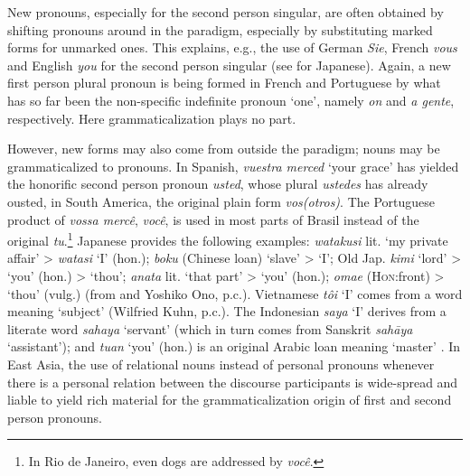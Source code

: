 New pronouns, especially for the second person singular, are often obtained by shifting pronouns around in the paradigm, especially by substituting marked forms for unmarked ones. This explains, e.g., the use of German \textit{Sie}, French \textit{vous} and English \textit{you} for the second person singular (see \citealt[112]{Syromjatnikov1980} for Japanese). Again, a new first person plural pronoun is being formed in French and Portuguese by what has so far been the non-specific indefinite pronoun ‘one’, namely \textit{on} and \textit{a gente}, respectively. Here grammaticalization plays no part.

However, new forms may also come from outside the paradigm; nouns may be grammaticalized to pronouns. In Spanish, \textit{vuestra merced} ‘your grace’ has yielded the honorific second person pronoun \textit{usted}, whose plural \textit{ustedes} has already ousted, in South America, the original plain form \textit{vos(otros)}. The Portuguese product of \textit{vossa mercê}, \textit{você}, is used in most parts of Brasil instead of the original \textit{tu}.\footnote{In Rio de Janeiro, even dogs are addressed by \textit{você}.} Japanese provides the following examples: \textit{watakusi} lit. ‘my private affair’ {\textgreater} \textit{watasi} ‘I’ (hon.); \textit{boku} (Chinese loan) ‘slave’ {\textgreater} ‘I’; Old Jap. \textit{kimi} ‘lord’ {\textgreater} ‘you’ (hon.) {\textgreater} ‘thou’; \textit{anata} lit. ‘that part’ {\textgreater} ‘you’ (hon.); \textit{omae} (\textsc{Hon}:front) {\textgreater} ‘thou’ (vulg.) (from \citealt{Syromjatnikov1980} and Yoshiko Ono, p.c.). Vietnamese \textit{tôi} ‘I’ comes from a word meaning ‘subject’ (Wilfried Kuhn, p.c.). The Indonesian \textit{saya} ‘I’ derives from a literate word \textit{sahaya} ‘servant’ (which in turn comes from Sanskrit \textit{sah\=aya} ‘assistant’); and \textit{tuan} ‘you’ (hon.) is an original Arabic loan meaning ‘master’ \citep[152]{Gabelentz1891}. In East Asia, the use of relational nouns instead of personal pronouns whenever there is a personal relation between the discourse participants is wide-spread and liable to yield rich material for the grammaticalization origin of first and second person pronouns.

